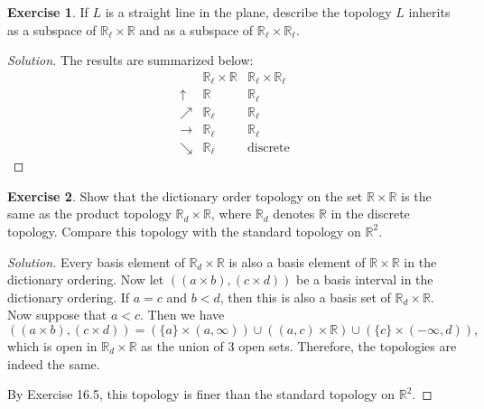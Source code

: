 \documentclass{article}
\theoremstyle{definition}
\newtheorem{exercise}{Exercise}[section]
\begin{document}
\begin{exercise}
  If $L$ is a straight line in the plane, describe the topology $L$ inherits as a subspace of $\mathbb{R}_\ell\times\mathbb{R}$ and as a subspace of $\mathbb{R}_\ell\times\mathbb{R}_\ell$.
\end{exercise}
\begin{proof}[Solution] The results are summarized below:
  $$
  \begin{array}{c|c|c}
    & \mathbb{R}_\ell\times\mathbb{R} & \mathbb{R}_\ell\times\mathbb{R}_\ell \\\hline
    \uparrow & \mathbb{R} & \mathbb{R}_\ell \\\hline
    \nearrow & \mathbb{R}_\ell & \mathbb{R}_\ell \\\hline
    \rightarrow & \mathbb{R}_\ell & \mathbb{R}_\ell \\\hline
    \searrow & \mathbb{R}_\ell & \text{discrete}
  \end{array}
  $$
\end{proof}


\begin{exercise}
  Show that the dictionary order topology on the set $\mathbb{R}\times\mathbb{R}$ is the same as the product topology $\mathbb{R}_d\times\mathbb{R}$, where $\mathbb{R}_d$ denotes $\mathbb{R}$ in the discrete topology. Compare
  this topology with the standard topology on $\mathbb{R}^2$.
\end{exercise}
\begin{proof}[Solution]
  Every basis element of $\mathbb{R}_d\times\mathbb{R}$ is also a basis element of $\mathbb{R}\times\mathbb{R}$ in the dictionary ordering. Now let $((a\times b),(c\times d))$ be a basis interval in the dictionary ordering. If $a = c$ and $b < d$, then this is also a basis set of $\mathbb{R}_d\times\mathbb{R}$. Now suppose that $a < c$. Then we have
  $$((a\times b),(c\times d)) = (\{a\}\times(a,\infty)) \cup ((a,c)\times\mathbb{R})\cup (\{c\}\times(-\infty,d)),$$
  which is open in $\mathbb{R}_d\times\mathbb{R}$ as the union of 3 open sets. Therefore, the topologies are indeed the same.

  By Exercise 16.5, this topology is finer than the standard topology on $\mathbb{R}^2$.
\end{proof}
\end{document}

